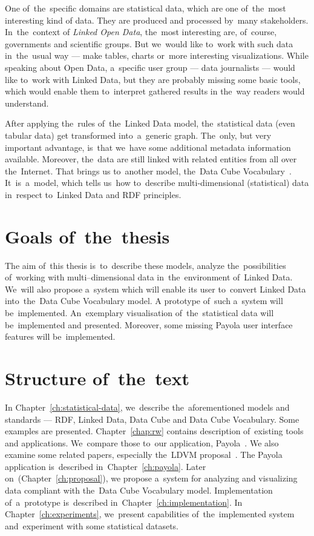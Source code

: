 One of~the~specific domains are statistical data, which are one of~the~most interesting kind
of data. They are produced and processed by~many stakeholders. In~the~context of
\emph{Linked Open Data}, the~most interesting are, of~course, governments and scientific groups.
But we~would like to~work with such data in~the~usual
way --- make tables, charts or~more interesting visualizations. While speaking about Open Data, a~specific
user group --- data journalists --- would like to~work with Linked Data, but they are probably
missing some basic tools, which would enable them to~interpret gathered results
in the~way readers would understand.

After applying the~rules of~the~Linked Data model, the~statistical data (even tabular data)
get transformed into~a~generic graph. The~only, but very important advantage, is~that we~have some additional
metadata information available. Moreover, the~data are still linked with related entities from all over the~Internet.
That brings
us to~another model, the~Data Cube Vocabulary~\cite{dcv}. It~is~a~model, which tells us~how to~describe
multi-dimensional (statistical) data in~respect to~Linked Data and RDF 
principles.

\section*{Goals of~the~thesis}

The aim of~this thesis is~to~describe these models, analyze the~possibilities of~working
with multi--dimensional data in~the~environment of~Linked Data. We~will also propose a~system
which will enable its user to~convert Linked Data into~the~Data Cube Vocabulary model.
A prototype of~such a~system will be~implemented. An~exemplary visualisation of~the~statistical
data will be~implemented and presented. Moreover, some missing Payola user interface features 
will be~implemented.

\section*{Structure of~the~text}
In Chapter~\ref{ch:statistical-data}, we~describe the~aforementioned 
models and standards --- RDF, Linked Data, Data Cube and Data Cube Vocabulary. 
Some examples are presented. Chapter~\ref{chap:rw} contains description of~existing tools and applications. We~compare those to~our application, Payola~\cite{payola}.
We also examine some related papers, especially the~LDVM proposal~\cite{ldvm}. 
The Payola application is~described in~Chapter~\ref{ch:payola}. Later on~(Chapter~\ref{ch:proposal}),
we propose a~system
for analyzing and visualizing data compliant with the~Data Cube Vocabulary model.
Implementation of~a~prototype is~described in~Chapter~\ref{ch:implementation}.
In Chapter~\ref{ch:experiments}, we~present capabilities of~the~implemented system
and~experiment with some statistical datasets.